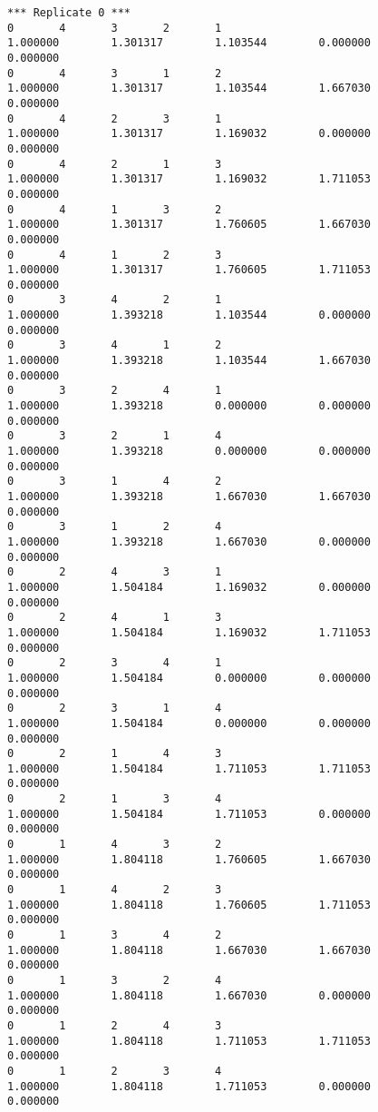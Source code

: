 \begin{verbatim}
*** Replicate 0 ***
0       4       3       2       1
1.000000        1.301317        1.103544        0.000000        0.000000
0       4       3       1       2
1.000000        1.301317        1.103544        1.667030        0.000000
0       4       2       3       1
1.000000        1.301317        1.169032        0.000000        0.000000
0       4       2       1       3
1.000000        1.301317        1.169032        1.711053        0.000000
0       4       1       3       2
1.000000        1.301317        1.760605        1.667030        0.000000
0       4       1       2       3
1.000000        1.301317        1.760605        1.711053        0.000000
0       3       4       2       1
1.000000        1.393218        1.103544        0.000000        0.000000
0       3       4       1       2
1.000000        1.393218        1.103544        1.667030        0.000000
0       3       2       4       1
1.000000        1.393218        0.000000        0.000000        0.000000
0       3       2       1       4
1.000000        1.393218        0.000000        0.000000        0.000000
0       3       1       4       2
1.000000        1.393218        1.667030        1.667030        0.000000
0       3       1       2       4
1.000000        1.393218        1.667030        0.000000        0.000000
0       2       4       3       1
1.000000        1.504184        1.169032        0.000000        0.000000
0       2       4       1       3
1.000000        1.504184        1.169032        1.711053        0.000000
0       2       3       4       1
1.000000        1.504184        0.000000        0.000000        0.000000
0       2       3       1       4
1.000000        1.504184        0.000000        0.000000        0.000000
0       2       1       4       3
1.000000        1.504184        1.711053        1.711053        0.000000
0       2       1       3       4
1.000000        1.504184        1.711053        0.000000        0.000000
0       1       4       3       2
1.000000        1.804118        1.760605        1.667030        0.000000
0       1       4       2       3
1.000000        1.804118        1.760605        1.711053        0.000000
0       1       3       4       2
1.000000        1.804118        1.667030        1.667030        0.000000
0       1       3       2       4
1.000000        1.804118        1.667030        0.000000        0.000000
0       1       2       4       3
1.000000        1.804118        1.711053        1.711053        0.000000
0       1       2       3       4
1.000000        1.804118        1.711053        0.000000        0.000000
\end{verbatim}

